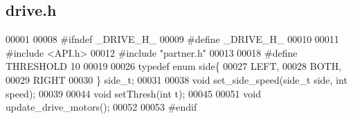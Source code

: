 \subsection{drive.\+h}
\label{drive_8h_source}

\begin{DoxyCode}
00001 
00008 \textcolor{preprocessor}{#ifndef \_DRIVE\_H\_}
00009 \textcolor{preprocessor}{#define \_DRIVE\_H\_}
00010 
00011 \textcolor{preprocessor}{#include <API.h>}
00012 \textcolor{preprocessor}{#include "partner.h"}
00013 
00018 \textcolor{preprocessor}{#define THRESHOLD 10}
00019 
00026 \textcolor{keyword}{typedef} \textcolor{keyword}{enum} side\{
00027   LEFT,
00028   BOTH,
00029   RIGHT
00030 \} side_t;
00031 
00038 \textcolor{keywordtype}{void} set_side_speed(side_t side, \textcolor{keywordtype}{int} speed);
00039 
00044 \textcolor{keywordtype}{void} setThresh(\textcolor{keywordtype}{int} t);
00045 
00051 \textcolor{keywordtype}{void} update_drive_motors();
00052 
00053 \textcolor{preprocessor}{#endif}
\end{DoxyCode}
